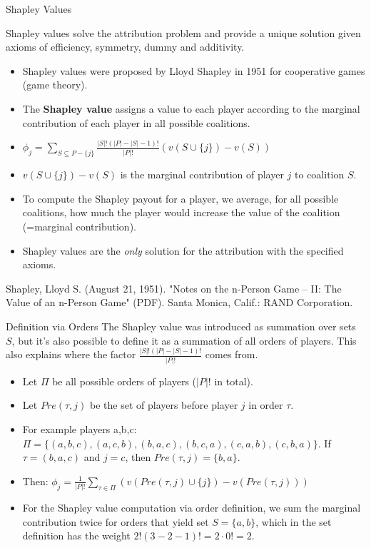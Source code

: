 \documentclass[aspectratio=169]{../latex_main/tntbeamer}  %
\begin{document}
\begin{frame}{Shapley Values}

  Shapley values solve the attribution problem and provide a unique solution given axioms of efficiency, symmetry, dummy and additivity.
\begin{itemize}
  \item Shapley values were proposed by Lloyd Shapley in 1951 for cooperative games (game theory).
  \item The \textbf{Shapley value} assigns a value to each player according to the marginal contribution of each player in all possible coalitions.
  \pause
  \smallskip
  \item $\phi_j = \sum_{S \subseteq P - \{j\} } \frac{|S|!(|P| - |S| - 1)!}{|P|!}(v(S \cup \{j\}) - v(S))$
  \item $v(S \cup \{j\}) - v(S)$ is the marginal contribution of player $j$ to coalition $S$.
  \pause
  \smallskip
  \item To compute the Shapley payout for a player, we average, for all possible coalitions, how much the player would increase the value of the coalition (=marginal contribution).
  \item Shapley values are the \textit{only} solution for the attribution with the specified axioms.
\end{itemize}

\vfill
\tiny{ Shapley, Lloyd S. (August 21, 1951). "Notes on the n-Person Game -- II: The Value of an n-Person Game" (PDF). Santa Monica, Calif.: RAND Corporation.}

\end{frame}

\begin{frame}{Definition via Orders}
The Shapley value was introduced as summation over sets $S$, but it's also possible to define it as a summation of all orders of players.
This also explains where the factor $\frac{|S|!(|P| - |S| - 1)!}{|P|!}$ comes from.
\begin{itemize}
  \item Let $\Pi$ be all possible orders of players ($|P|!$ in total).
  \item Let $Pre(\tau,j)$ be the set of players before player $j$ in order $\tau$.
  \item For example players a,b,c: $\Pi = \{(a,b,c), (a,c,b), (b,a,c), (b,c,a), (c,a,b), (c,b,a)\}$. If $\tau = (b,a,c)$ and $j=c$, then $Pre(\tau,j) = \{b, a\}$.
  \pause
  \item Then: $\phi_j = \frac{1}{|P|!} \sum_{\tau \in \Pi} (v(Pre(\tau,j) \cup \{j\}) - v(Pre(\tau,j)))$
  \pause
  \item For the Shapley value computation via order definition, we sum the marginal contribution twice for orders that yield set $S = \{a,b\}$, which in the set definition has the weight $2! (3 - 2 - 1)! = 2 \cdot 0! = 2$.
\end{itemize}

\end{frame}
\end{document}
